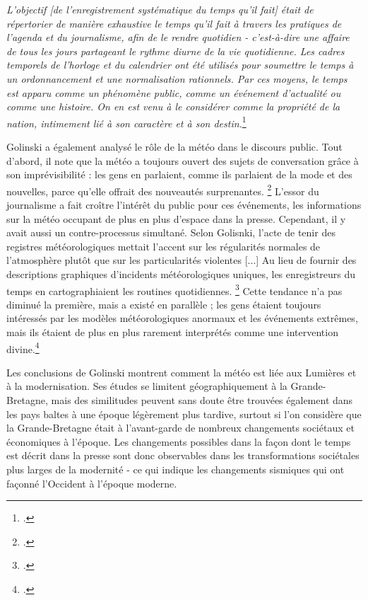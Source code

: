 \documentclass[a4paper,twoside,12pt]{article}
\begin{document}
\begin{displayquote}
\textit{
L'objectif [de l'enregistrement systématique du temps qu'il fait] était de répertorier de manière exhaustive le temps qu'il fait à travers les pratiques de l'agenda et du journalisme, afin de le rendre quotidien - c'est-à-dire une affaire de tous les jours partageant le rythme diurne de la vie quotidienne. Les cadres temporels de l'horloge et du calendrier ont été utilisés pour soumettre le temps à un ordonnancement et une normalisation rationnels. Par ces moyens, le temps est apparu comme un phénomène public, comme un événement d'actualité ou comme une histoire. On en est venu à le considérer comme la propriété de la nation, intimement lié à son caractère et à son destin.}\footcite[18-19]{golinski_time_2003}
\end{displayquote}

Golinski a également analysé le rôle de la météo dans le discours public. Tout d'abord, il note que la météo a toujours ouvert des sujets de conversation grâce à son imprévisibilité : \og les gens en parlaient, comme ils parlaient de la mode et des nouvelles, parce qu'elle offrait des nouveautés surprenantes. \fg{}\footcite[25-26]{golinski_time_2003} L'essor du journalisme a fait croître l'intérêt du public pour ces événements, les informations sur la météo occupant de plus en plus d'espace dans la presse. Cependant, il y avait aussi un contre-processus simultané. Selon Golisnki, l'acte de tenir des registres météorologiques  \og mettait l'accent sur les régularités normales de l'atmosphère plutôt que sur les particularités violentes [...] Au lieu de fournir des descriptions graphiques d'incidents météorologiques uniques, les enregistreurs du temps en cartographiaient les routines quotidiennes. \fg{}\footcite[22]{golinski_time_2003} Cette tendance n'a pas diminué la première, mais a existé en parallèle ; les gens étaient toujours intéressés par les modèles météorologiques anormaux et les événements extrêmes, mais ils étaient de plus en plus rarement interprétés comme une intervention divine.\footcite[25]{golinski_time_2003}

Les conclusions de Golinski montrent comment la météo est liée aux Lumières et à la modernisation. Ses études se limitent géographiquement à la Grande-Bretagne, mais des similitudes peuvent sans doute être trouvées également dans les pays baltes à une époque légèrement plus tardive, surtout si l'on considère que la Grande-Bretagne était à l'avant-garde de nombreux changements sociétaux et économiques à l'époque. Les changements possibles dans la façon dont le temps est décrit dans la presse sont donc observables dans les transformations sociétales plus larges de la modernité - ce qui indique les changements sismiques qui ont façonné l'Occident à l'époque moderne.
\end{document}
